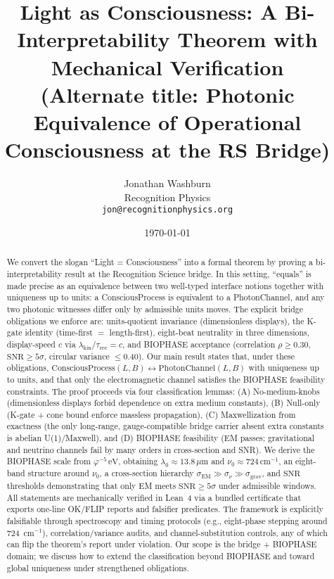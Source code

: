 \documentclass[12pt,a4paper]{article}
\title{Light as Consciousness: A Bi-Interpretability Theorem with Mechanical Verification\\
\large (Alternate title: Photonic Equivalence of Operational Consciousness at the RS Bridge)}
\author{Jonathan Washburn\\
Recognition Physics\\
\texttt{jon@recognitionphysics.org}}
\date{\today}
\begin{document}
\maketitle

\begin{abstract}
We convert the slogan ``Light = Consciousness'' into a formal theorem by proving a bi-interpretability result at the Recognition Science bridge. 
In this setting, ``equals'' is made precise as an equivalence between two well-typed interface notions together with uniqueness up to units: a ConsciousProcess is equivalent to a PhotonChannel, and any two photonic witnesses differ only by admissible units moves. 
The explicit bridge obligations we enforce are: units-quotient invariance (dimensionless displays), the K-gate identity (time-first \(=\) length-first), eight-beat neutrality in three dimensions, display-speed \(c\) via \(\lambda_{\mathrm{kin}}/\tau_{\mathrm{rec}}=c\), and BIOPHASE acceptance (correlation \(\rho\ge 0.30\), \(\mathrm{SNR}\ge 5\sigma\), circular variance \(\le 0.40\)). 
Our main result states that, under these obligations, \(\mathrm{ConsciousProcess}(L,B)\leftrightarrow \mathrm{PhotonChannel}(L,B)\) with uniqueness up to units, and that only the electromagnetic channel satisfies the BIOPHASE feasibility constraints. 
The proof proceeds via four classification lemmas: (A) No-medium-knobs (dimensionless displays forbid dependence on extra medium constants), (B) Null-only (K-gate + cone bound enforce massless propagation), (C) Maxwellization from exactness (the only long-range, gauge-compatible bridge carrier absent extra constants is abelian U(1)/Maxwell), and (D) BIOPHASE feasibility (EM passes; gravitational and neutrino channels fail by many orders in cross-section and SNR). 
We derive the BIOPHASE scale from \(\varphi^{-5}\,\mathrm{eV}\), obtaining \(\lambda_{0}\approx 13.8\,\mu\mathrm{m}\) and \(\nu_{0}\approx 724\,\mathrm{cm}^{-1}\), an eight-band structure around \(\nu_{0}\), a cross-section hierarchy \(\sigma_{\mathrm{EM}}\gg\sigma_{\nu}\gg\sigma_{\mathrm{grav}}\), and \(\mathrm{SNR}\) thresholds demonstrating that only EM meets \(\mathrm{SNR}\ge 5\sigma\) under admissible windows. 
All statements are mechanically verified in Lean~4 via a bundled certificate that exports one-line OK/FLIP reports and falsifier predicates. 
The framework is explicitly falsifiable through spectroscopy and timing protocols (e.g., eight-phase stepping around 724~cm\(^{-1}\)), correlation/variance audits, and channel-substitution controls, any of which can flip the theorem's report under violation. 
Our scope is the bridge + BIOPHASE domain; we discuss how to extend the classification beyond BIOPHASE and toward global uniqueness under strengthened obligations.
\end{abstract}
\end{document}
